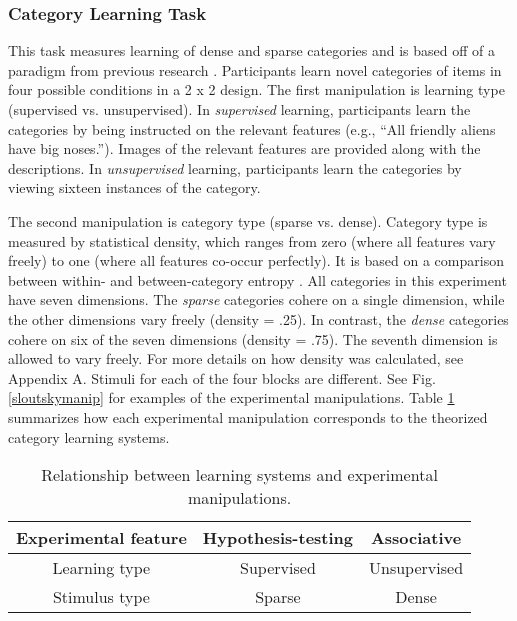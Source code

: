 \documentclass[../dissertation.tex]{subfiles}
\begin{document}
\subsubsection{Category Learning Task}
	This task measures learning of dense and sparse categories and is based off of a paradigm from previous research \citep{Kloos2008}. Participants learn novel categories of items in four possible conditions in a 2 x 2 design. The first manipulation is learning type (supervised vs. unsupervised). In \textit{supervised} learning, participants learn the categories by being instructed on the relevant features (e.g., “All friendly aliens have big noses.”). Images of the relevant features are provided along with the descriptions. In \textit{unsupervised} learning, participants learn the categories by viewing sixteen instances of the category. \par
	The second manipulation is category type (sparse vs. dense). Category type is measured by statistical density, which ranges from zero (where all features vary freely) to one (where all features co-occur perfectly). It is based on a comparison between within- and between-category entropy \citep{Sloutsky2010}. All categories in this experiment have seven dimensions. The \textit{sparse} categories cohere on a single dimension, while the other dimensions vary freely (density = .25). In contrast, the \textit{dense} categories cohere on six of the seven dimensions (density = .75). The seventh dimension is allowed to vary freely. For more details on how density was calculated, see Appendix A. Stimuli for each of the four blocks are different. See Fig. \ref{sloutskymanip} for examples of the experimental manipulations. Table \ref{stimsystems} summarizes how each experimental manipulation corresponds to the theorized category learning systems. \par
	
\begin{table}[h]
\caption{Relationship between learning systems and experimental manipulations.}
\begin{center}
\begin{tabular}{c|c|c}
Experimental feature & Hypothesis-testing & Associative  \\
\hline
Learning type        & Supervised         & Unsupervised \\
Stimulus type        & Sparse             & Dense       
\end{tabular}
\label{stimsystems}
\end{center}
\end{table}
\end{document}
